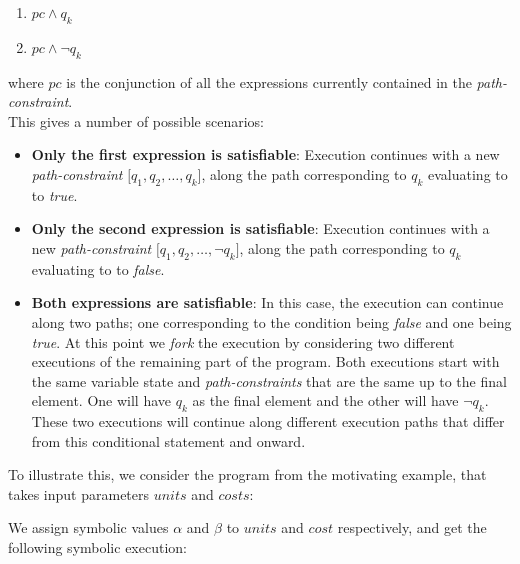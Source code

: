 		\begin{enumerate}
			\item $ pc \land q_k$
			\item $ pc \land \neg q_k$
		\end{enumerate}	
		where $pc$ is the conjunction of all the expressions currently contained in the \emph{path-constraint}.
		\\
		This gives a number of possible scenarios:	
		\begin{itemize}
			\item \textbf{Only the first expression is satisfiable}: Execution continues with a new \emph{path-constraint} $\lbrack q_1, q_2, \ldots, q_k \rbrack$, along the path corresponding to $q_k$ evaluating to to \emph{true}.
			\item \textbf{Only the second expression is satisfiable}:  Execution continues with a new \emph{path-constraint} $\lbrack q_1, q_2, \ldots, \neg q_k \rbrack$, along the path corresponding to $q_k$ evaluating to to \emph{false}.
			
			\item \textbf{Both expressions are satisfiable}: In this case, the execution can continue along two paths; one corresponding to the condition being \emph{false} and one being \emph{true}. At this point we \emph{fork} the execution by considering two different executions of the remaining part of the program. Both executions start with the same variable state and \emph{path-constraints} that are the same
			 up to the final element. One will have $q_k$ as the final element and the other will have $\neg q_k$. 
			These two executions will continue along different execution paths that differ from this conditional statement and onward.
		\end{itemize}
		
		To illustrate this, we consider the program from the motivating example, that takes input parameters $units$ and $costs$:
		
		\motexample{}
		\newpage
		We assign symbolic values $\alpha$ and $\beta$ to $units$ and $cost$ respectively, and get the following symbolic execution:
		
